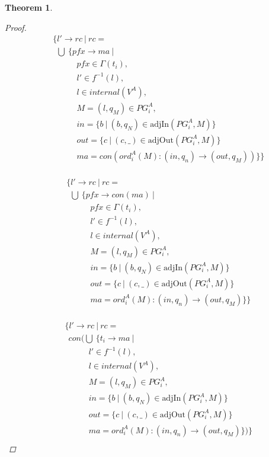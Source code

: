 \documentclass[twocolumn]{sig-alternate-10pt}
\newtheorem{thm}{Theorem}[section]
\begin{document}
\begin{thm}
\begin{proof}
  \[ \begin{array}{l}
     ~~~~~ \{ l' \rightarrow rc ~\vert~ rc = \\
     ~~~~~~~ \bigcup~ \{ pfx \rightarrow ma ~\vert~ \\
     ~~~~~~~~~~~~~~~~~~ pfx \in \Gamma(t_i), \\
     ~~~~~~~~~~~~~~~~~~ l' \in f^{-1}(l), \\
     ~~~~~~~~~~~~~~~~~~ l \in internal(V^A), \\
     ~~~~~~~~~~~~~~~~~~ M = (l,q_M) \in PG^A_i, \\
     ~~~~~~~~~~~~~~~~~~ in = \{ b ~\vert~ (b,q_N) \in \text{adjIn}(PG^A_i,M) \} \\
     ~~~~~~~~~~~~~~~~~~ out = \{ c ~\vert~ (c,\_) \in \text{adjOut}(PG^A_i,M) \} \\
     ~~~~~~~~~~~~~~~~~~ ma = con(ord^A_i(M) : (in,q_n) \rightarrow (out,q_M)) \} \} \\
  \end{array} \]%

  \[ \begin{array}{l}
     ~~~~~ \{ l' \rightarrow rc ~\vert~ rc = \\
     ~~~~~~~ \bigcup~ \{ pfx \rightarrow con(ma) ~\vert~ \\
     ~~~~~~~~~~~~~~~~~~ pfx \in \Gamma(t_i), \\
     ~~~~~~~~~~~~~~~~~~ l' \in f^{-1}(l), \\
     ~~~~~~~~~~~~~~~~~~ l \in internal(V^A), \\
     ~~~~~~~~~~~~~~~~~~ M = (l,q_M) \in PG^A_i, \\
     ~~~~~~~~~~~~~~~~~~ in = \{ b ~\vert~ (b,q_N) \in \text{adjIn}(PG^A_i,M) \} \\
     ~~~~~~~~~~~~~~~~~~ out = \{ c ~\vert~ (c,\_) \in \text{adjOut}(PG^A_i,M) \} \\
     ~~~~~~~~~~~~~~~~~~ ma = ord^A_i(M) : (in,q_n) \rightarrow (out,q_M) \} \} \\
  \end{array} \]%

  \[ \begin{array}{l}
     ~~~~~ \{ l' \rightarrow rc ~\vert~ rc = \\
     ~~~~~~~ con(\bigcup~ \{ t_i \rightarrow ma ~\vert~ \\
     ~~~~~~~~~~~~~~~~~~ l' \in f^{-1}(l), \\
     ~~~~~~~~~~~~~~~~~~ l \in internal(V^A), \\
     ~~~~~~~~~~~~~~~~~~ M = (l,q_M) \in PG^A_i, \\
     ~~~~~~~~~~~~~~~~~~ in = \{ b ~\vert~ (b,q_N) \in \text{adjIn}(PG^A_i,M) \} \\
     ~~~~~~~~~~~~~~~~~~ out = \{ c ~\vert~ (c,\_) \in \text{adjOut}(PG^A_i,M) \} \\
     ~~~~~~~~~~~~~~~~~~ ma = ord^A_i(M) : (in,q_n) \rightarrow (out,q_M) \}) \} \\
  \end{array} \]%



\end{proof}
\end{thm}
\end{document}
